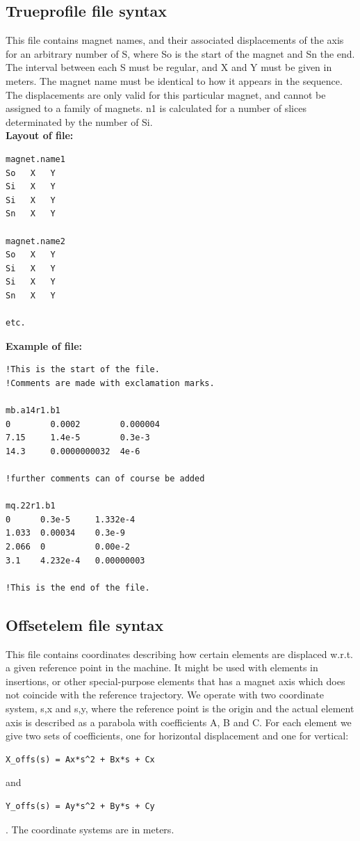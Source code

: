 \subsection{Trueprofile file syntax}
This file contains magnet names, and their associated displacements of
the axis for  an arbitrary number of S, where So is the start of the
magnet and Sn the end. The interval between each S must be regular, and
X and Y  must be given in meters. The magnet name must be identical to
how it appears in the  sequence. The displacements are only valid for
this particular magnet, and cannot be  assigned to a family of
magnets. n1 is calculated for a number of slices determinated by the
number of Si. 
\\
{\bf Layout of file:}
\begin{verbatim}
magnet.name1
So   X   Y
Si   X   Y
Si   X   Y
Sn   X   Y

magnet.name2
So   X   Y
Si   X   Y
Si   X   Y
Sn   X   Y

etc.
\end{verbatim}

{\bf Example of file:}
\begin{verbatim}
!This is the start of the file.
!Comments are made with exclamation marks.

mb.a14r1.b1
0        0.0002        0.000004
7.15     1.4e-5        0.3e-3
14.3     0.0000000032  4e-6

!further comments can of course be added

mq.22r1.b1
0      0.3e-5     1.332e-4
1.033  0.00034    0.3e-9
2.066  0          0.00e-2
3.1    4.232e-4   0.00000003

!This is the end of the file.
\end{verbatim}

\subsection{Offsetelem file syntax}
This file contains coordinates describing how certain elements are
displaced w.r.t. a  given reference point in the machine. It might be
used with elements in insertions, or other special-purpose elements that
has a magnet axis which does not coincide with the reference
trajectory. We operate with two coordinate system, s,x and s,y, where
the reference point is the origin and the actual element axis is
described as a parabola with coefficients A, B and C. For each element
we give two sets of coefficients, one for horizontal displacement and
one for vertical:  
\begin{verbatim}
X_offs(s) = Ax*s^2 + Bx*s + Cx 
\end{verbatim}
and 
\begin{verbatim}
Y_offs(s) = Ay*s^2 + By*s + Cy
\end{verbatim}.
The coordinate systems are in meters. 

